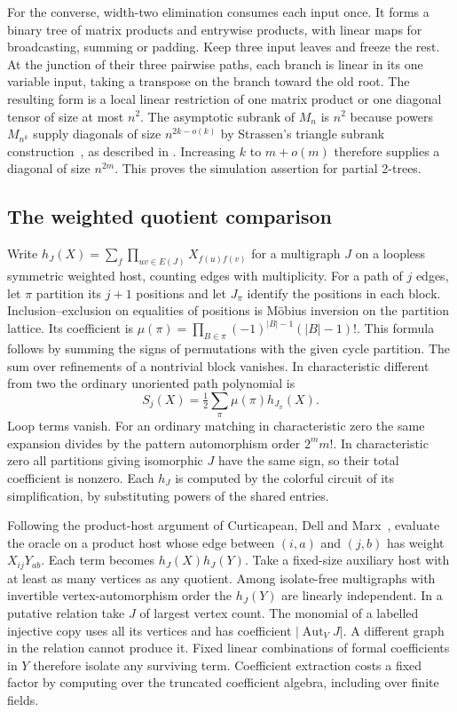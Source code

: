 \documentclass[11pt,letterpaper]{article}
\begin{document}
For the converse, width-two elimination consumes each input once. It forms a binary tree of matrix products and entrywise products, with linear maps for broadcasting, summing or padding. Keep three input leaves and freeze the rest. At the junction of their three pairwise paths, each branch is linear in its one variable input, taking a transpose on the branch toward the old root. The resulting form is a local linear restriction of one matrix product or one diagonal tensor of size at most \(n^2\). The asymptotic subrank of \(M_n\) is \(n^2\) because powers \(M_{n^k}\) supply diagonals of size \(n^{2k-o(k)}\) by Strassen's triangle subrank construction~\cite{strassen-relative}, as described in \cite[Section~5.1]{euclid}. Increasing \(k\) to \(m+o(m)\) therefore supplies a diagonal of size \(n^{2m}\). This proves the simulation assertion for partial 2-trees.

\subsection{The weighted quotient comparison}\label{the-weighted-quotient-comparison}

Write \(h_J(X)=\sum_f\prod_{uv\in E(J)}X_{f(u)f(v)}\) for a multigraph \(J\) on a loopless symmetric weighted host, counting edges with multiplicity. For a path of \(j\) edges, let \(\pi\) partition its \(j+1\) positions and let \(J_\pi\) identify the positions in each block. Inclusion--exclusion on equalities of positions is Möbius inversion on the partition lattice. Its coefficient is \(\mu(\pi)=\prod_{B\in\pi}(-1)^{|B|-1}(|B|-1)!\). This formula follows by summing the signs of permutations with the given cycle partition. The sum over refinements of a nontrivial block vanishes. In characteristic different from two the ordinary unoriented path polynomial is
\[
             S_j(X)=\tfrac12\sum_{\pi}\mu(\pi)h_{J_\pi}(X).
\]
Loop terms vanish. For an ordinary matching in characteristic zero the same expansion divides by the pattern automorphism order \(2^m m!\). In characteristic zero all partitions giving isomorphic \(J\) have the same sign, so their total coefficient is nonzero. Each \(h_J\) is computed by the colorful circuit of its simplification, by substituting powers of the shared entries.

Following the product-host argument of Curticapean, Dell and Marx~\cite[Theorem~1.3 and Sections~2--3, full version]{cdm}, evaluate the oracle on a product host whose edge between \((i,a)\) and \((j,b)\) has weight \(X_{ij}Y_{ab}\). Each term becomes \(h_J(X)h_J(Y)\). Take a fixed-size auxiliary host with at least as many vertices as any quotient. Among isolate-free multigraphs with invertible vertex-automorphism order the \(h_J(Y)\) are linearly independent. In a putative relation take \(J\) of largest vertex count. The monomial of a labelled injective copy uses all its vertices and has coefficient \(|\operatorname{Aut}_V J|\). A different graph in the relation cannot produce it. Fixed linear combinations of formal coefficients in \(Y\) therefore isolate any surviving term. Coefficient extraction costs a fixed factor by computing over the truncated coefficient algebra, including over finite fields.
\end{document}

